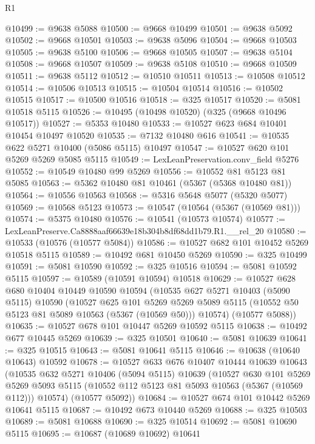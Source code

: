 \begin{lexlean}{R1}
\begin{coremodule}
@10499 := @9638 @5088
@10500 := @9668 @10499
@10501 := @9638 @5092
@10502 := @9668 @10501
@10503 := @9638 @5096
@10504 := @9668 @10503
@10505 := @9638 @5100
@10506 := @9668 @10505
@10507 := @9638 @5104
@10508 := @9668 @10507
@10509 := @9638 @5108
@10510 := @9668 @10509
@10511 := @9638 @5112
@10512 := @10510 @10511
@10513 := @10508 @10512
@10514 := @10506 @10513
@10515 := @10504 @10514
@10516 := @10502 @10515
@10517 := @10500 @10516
@10518 := @325 @10517
@10520 := @5081 @10518 @5115
@10526 := @10495 (@10498 @10520) (@325 (@9668 @10496 @10517))
@10527 := @5353 @10480
@10533 := @10527 @623 @684 @10401 @10454 @10497 @10520
@10535 := @7132 @10480 @616
@10541 := @10535 @622 @5271 @10400 (@5086 @5115) @10497
@10547 := @10527 @620 @101 @5269 @5269 @5085 @5115
@10549 := LexLeanPreservation.conv_field @5276
@10552 := @10549 @10480 @99 @5269
@10556 := @10552 @81 @5123 @81 @5085
@10563 := @5362 @10480 @81 @10461 (@5367 (@5368 @10480 @81))
@10564 := @10556 @10563
@10568 := @5316 @5648 @5077 (@5320 @5077)
@10569 := @10568 @5123
@10573 := @10547 (@10564 (@5367 (@10569 @81)))
@10574 := @5375 @10480
@10576 := @10541 (@10573 @10574)
@10577 := LexLeanPreserve.Ca8888aaf66639e18b304b8df68dd1b79.R1.__rel_20
@10580 := @10533 (@10576 (@10577 @5084))
@10586 := @10527 @682 @101 @10452 @5269 @10518 @5115
@10589 := @10492 @681 @10450 @5269
@10590 := @325 @10499
@10591 := @5081 @10590
@10592 := @325 @10516
@10594 := @5081 @10592 @5115
@10597 := @10589 (@10591 @10594) @10518
@10629 := @10527
    @628
    @680
    @10404
    @10449
    @10590
    @10594
    (@10535
      @627
      @5271
      @10403
      (@5090 @5115)
      @10590
      (@10527
        @625
        @101
        @5269
        @5269
        @5089
        @5115
        (@10552 @50 @5123 @81 @5089 @10563 (@5367 (@10569 @50)))
        @10574)
      (@10577 @5088))
@10635 := @10527 @678 @101 @10447 @5269 @10592 @5115
@10638 := @10492 @677 @10445 @5269
@10639 := @325 @10501
@10640 := @5081 @10639
@10641 := @325 @10515
@10643 := @5081 @10641 @5115
@10646 := @10638 (@10640 @10643) @10592
@10678 := @10527
    @633
    @676
    @10407
    @10444
    @10639
    @10643
    (@10535
      @632
      @5271
      @10406
      (@5094 @5115)
      @10639
      (@10527
        @630
        @101
        @5269
        @5269
        @5093
        @5115
        (@10552 @112 @5123 @81 @5093 @10563 (@5367 (@10569 @112)))
        @10574)
      (@10577 @5092))
@10684 := @10527 @674 @101 @10442 @5269 @10641 @5115
@10687 := @10492 @673 @10440 @5269
@10688 := @325 @10503
@10689 := @5081 @10688
@10690 := @325 @10514
@10692 := @5081 @10690 @5115
@10695 := @10687 (@10689 @10692) @10641

\end{coremodule}
\end{lexlean}

